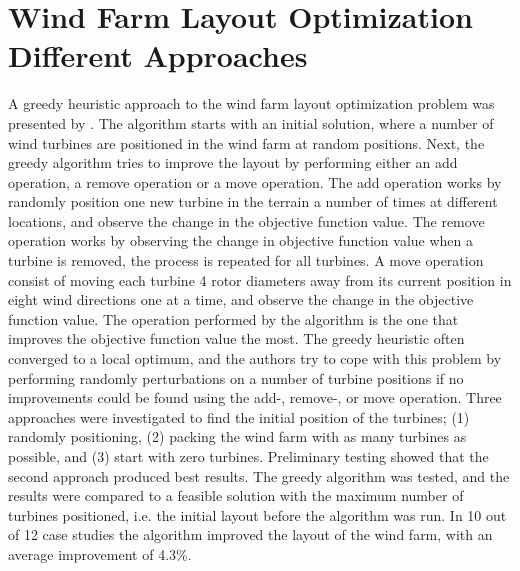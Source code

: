 \section{Wind Farm Layout Optimization Different Approaches}\label{section:relatedworkother}


A greedy heuristic approach to the wind farm layout optimization problem was presented by \cite{Ozturk}. The algorithm starts with an initial solution, where a number of wind turbines are positioned in the wind farm at random positions. Next, the greedy algorithm tries to improve the layout by performing either an add operation, a remove operation or a move operation. The add operation works by randomly position one new turbine in the terrain a number of times at different locations, and observe the change in the objective function value. The remove operation works by observing the change in objective function value when a turbine is removed, the process is repeated for all turbines. A move operation consist of moving each turbine 4 rotor diameters away from its current position in eight wind directions one at a time, and observe the change in the objective function value. The operation performed by the algorithm is the one that improves the objective function value the most. The greedy heuristic often converged to a local optimum, and the authors try to cope with this problem by performing randomly perturbations on a number of turbine positions if no improvements could be found using the add-, remove-, or move operation. Three approaches were investigated to find the initial position of the turbines; (1) randomly positioning, (2) packing the wind farm with as many turbines as possible, and (3) start with zero turbines. Preliminary testing showed that the second approach produced best results. The greedy algorithm was tested, and the results were compared to a feasible solution with the maximum number of turbines positioned, i.e. the initial layout before the algorithm was run. In 10 out of 12 case studies the algorithm improved the layout of the wind farm, with an average improvement of 4.3\%. \\


